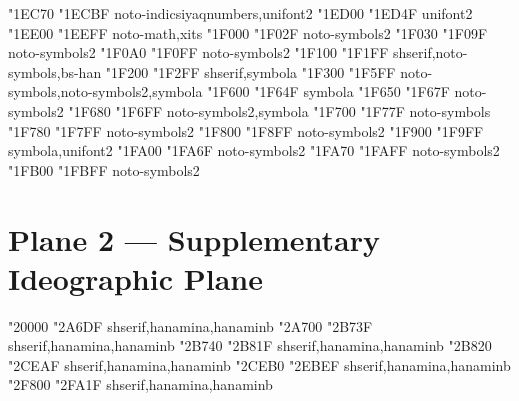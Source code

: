 \documentclass{article}
\begin{document}
                            { "1EC70} { "1ECBF} {noto-indicsiyaqnumbers,unifont2}
                          { "1ED00} { "1ED4F} {unifont2}
         { "1EE00} { "1EEFF} {noto-math,xits}
                                  { "1F000} { "1F02F} {noto-symbols2}
                                   { "1F030} { "1F09F} {noto-symbols2}
                                  { "1F0A0} { "1F0FF} {noto-symbols2}
               { "1F100} { "1F1FF} {shserif,noto-symbols,bs-han}
                { "1F200} { "1F2FF} {shserif,symbola}
          { "1F300} { "1F5FF} {noto-symbols,noto-symbols2,symbola}
                                      { "1F600} { "1F64F} {symbola}
                            { "1F650} { "1F67F} {noto-symbols2}
                      { "1F680} { "1F6FF} {noto-symbols2,symbola}
                             { "1F700} { "1F77F} {noto-symbols}
                      { "1F780} { "1F7FF} {noto-symbols2}
                          { "1F800} { "1F8FF} {noto-symbols2}
           { "1F900} { "1F9FF} {symbola,unifont2}
                                  { "1FA00} { "1FA6F} {noto-symbols2}
             { "1FA70} { "1FAFF} {noto-symbols2}
                   { "1FB00} { "1FBFF} {noto-symbols2}

\section{Plane 2 --- Supplementary Ideographic Plane}

             { "20000} { "2A6DF} {shserif,hanamina,hanaminb}
             { "2A700} { "2B73F} {shserif,hanamina,hanaminb}
             { "2B740} { "2B81F} {shserif,hanamina,hanaminb}
             { "2B820} { "2CEAF} {shserif,hanamina,hanaminb}
             { "2CEB0} { "2EBEF} {shserif,hanamina,hanaminb}
        { "2F800} { "2FA1F} {shserif,hanamina,hanaminb}
\end{document}
